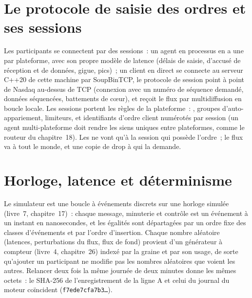 \label{lst:mx:build-a-matching-engine-and-exchange-simulator:gaps}

\section{Le protocole de saisie des ordres et ses sessions}

Les participants se connectent par des sessions~: un agent en processus en a une par plateforme, avec son propre modèle de latence (délais de saisie, d'accusé de réception et de données, gigue,
pics)~; un client en direct se connecte au serveur C++20 de cette machine par SoupBinTCP, le protocole de session point à point de Nasdaq au-dessus de TCP (connexion avec un
numéro de séquence demandé, données séquencées, battements de cœur), et reçoit le flux par multidiffusion en boucle locale. Les sessions portent les règles de la plateforme~: , groupes d'auto-appariement, limiteurs, et identifiants d'ordre client numérotés par session (un agent multi-plateforme doit rendre les siens uniques entre plateformes,
comme le routeur du chapitre~18). Les  ne vont qu'à la session qui possède l'ordre~; le flux va à tout le monde, et une copie de drop à qui la demande.

\section{Horloge, latence et déterminisme}

Le simulateur est une boucle à événements discrets sur une horloge simulée (livre~7, chapitre~17)~: chaque message, minuterie et contrôle est un événement à un instant en nanosecondes, et les égalités sont départagées
par un ordre fixe des classes d'événements et par l'ordre d'insertion. Chaque nombre aléatoire (latences, perturbations du flux, flux de fond) provient d'un
générateur à compteur (livre~4, chapitre~26) indexé par la graine et par son usage, de sorte qu'ajouter un participant ne modifie pas
les nombres aléatoires que voient les autres. Relancer deux fois la même journée de deux minutes donne les mêmes octets~: le SHA-256 de l'enregistrement de la ligne A et celui du
journal du moteur coïncident (\texttt{f7ede7cfa7b3\dots}).

